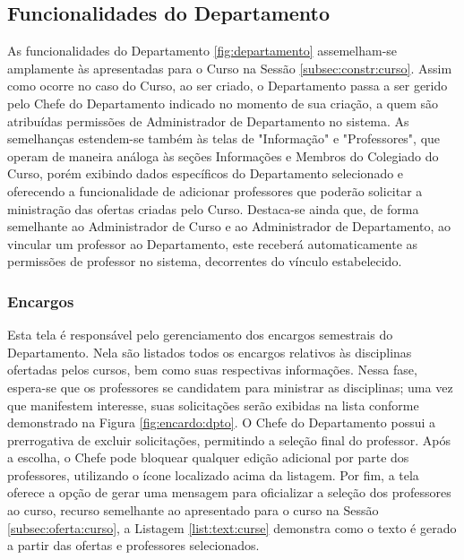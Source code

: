 \subsection{Funcionalidades do Departamento} \label{subsec:constr:departamento}

As funcionalidades do Departamento \ref{fig:departamento} assemelham-se amplamente às apresentadas para o Curso na Sessão \ref{subsec:constr:curso}. Assim como ocorre no caso do Curso, ao ser criado, o Departamento passa a ser gerido pelo Chefe do Departamento indicado no momento de sua criação, a quem são atribuídas permissões de Administrador de Departamento no sistema. As semelhanças estendem-se também às telas de "Informação" e "Professores", que operam de maneira análoga às seções Informações e Membros do Colegiado do Curso, porém exibindo dados específicos do Departamento selecionado e oferecendo a funcionalidade de adicionar professores que poderão solicitar a ministração das ofertas criadas pelo Curso. Destaca-se ainda que, de forma semelhante ao Administrador de Curso e ao Administrador de Departamento, ao vincular um professor ao Departamento, este receberá automaticamente as permissões de professor no sistema, decorrentes do vínculo estabelecido.


\subsubsection{Encargos}\label{subsec:dpto:encargos}

Esta tela é responsável pelo gerenciamento dos encargos semestrais do Departamento. Nela são listados todos os encargos relativos às disciplinas ofertadas pelos cursos, bem como suas respectivas informações. Nessa fase, espera-se que os professores se candidatem para ministrar as disciplinas; uma vez que manifestem interesse, suas solicitações serão exibidas na lista conforme demonstrado na Figura \ref{fig:encardo:dpto}. O Chefe do Departamento possui a prerrogativa de excluir solicitações, permitindo a seleção final do professor. Após a escolha, o Chefe pode bloquear qualquer edição adicional por parte dos professores, utilizando o ícone localizado acima da listagem. Por fim, a tela oferece a opção de gerar uma mensagem para oficializar a seleção dos professores ao curso, recurso semelhante ao apresentado para o curso na Sessão \ref{subsec:oferta:curso}, a Listagem \ref{list:text:curse} demonstra como o texto é gerado a partir das ofertas e professores selecionados.


